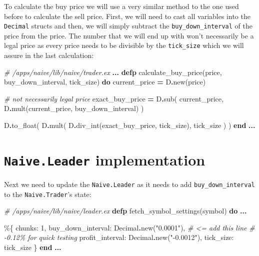 \documentclass[
  oneside]{book}
\newenvironment{Shaded}{\begin{snugshade}}{\end{snugshade}}
\newcommand{\CommentTok}[1]{\textcolor[rgb]{0.56,0.35,0.01}{\textit{#1}}}
\newcommand{\ConstantTok}[1]{\textcolor[rgb]{0.00,0.00,0.00}{#1}}
\newcommand{\DecValTok}[1]{\textcolor[rgb]{0.00,0.00,0.81}{#1}}
\newcommand{\KeywordTok}[1]{\textcolor[rgb]{0.13,0.29,0.53}{\textbf{#1}}}
\newcommand{\NormalTok}[1]{#1}
\newcommand{\OperatorTok}[1]{\textcolor[rgb]{0.81,0.36,0.00}{\textbf{#1}}}
\newcommand{\StringTok}[1]{\textcolor[rgb]{0.31,0.60,0.02}{#1}}
\newcommand{\VariableTok}[1]{\textcolor[rgb]{0.00,0.00,0.00}{#1}}
\begin{document}
To calculate the buy price we will use a very similar method to the one used
before to calculate the sell price. First, we will need to cast all variables
into the \texttt{Decimal} structs and then, we will simply subtract the \texttt{buy\_down\_interval} of the price from the price. The number that we will end up with won't necessarily be a legal price as every price needs to be divisible by the \texttt{tick\_size} which we will assure in the last calculation:

\begin{Shaded}
\begin{Highlighting}[]
  \CommentTok{\# /apps/naive/lib/naive/trader.ex}
  \OperatorTok{...}
  \KeywordTok{defp}\NormalTok{ calculate\_buy\_price(price, buy\_down\_interval, tick\_size) }\KeywordTok{do}
\NormalTok{    current\_price }\OperatorTok{=}\NormalTok{ D}\OperatorTok{.}\NormalTok{new(price)}

    \CommentTok{\# not necessarily legal price}
\NormalTok{    exact\_buy\_price }\OperatorTok{=}
\NormalTok{      D}\OperatorTok{.}\NormalTok{sub(}
\NormalTok{        current\_price,}
\NormalTok{        D}\OperatorTok{.}\NormalTok{mult(current\_price, buy\_down\_interval)}
\NormalTok{      )}

\NormalTok{    D}\OperatorTok{.}\NormalTok{to\_float(}
\NormalTok{      D}\OperatorTok{.}\NormalTok{mult(}
\NormalTok{        D}\OperatorTok{.}\NormalTok{div\_int(exact\_buy\_price, tick\_size),}
\NormalTok{        tick\_size}
\NormalTok{      )}
\NormalTok{    )}
  \KeywordTok{end}
  \OperatorTok{...}
\end{Highlighting}
\end{Shaded}

\hypertarget{naive.leader-implementation}{%
\section{\texorpdfstring{\texttt{Naive.Leader} implementation}{Naive.Leader implementation}}\label{naive.leader-implementation}}

Next we need to update the \texttt{Naive.Leader} as it needs to add \texttt{buy\_down\_interval} to the \texttt{Naive.Trader}'s state:

\begin{Shaded}
\begin{Highlighting}[]
  \CommentTok{\# /apps/naive/lib/naive/leader.ex}
  \KeywordTok{defp}\NormalTok{ fetch\_symbol\_settings(symbol) }\KeywordTok{do}
    \OperatorTok{...}

\NormalTok{    \%\{}
      \VariableTok{chunks:} \DecValTok{1}\NormalTok{,}
      \VariableTok{buy\_down\_interval:} \ConstantTok{Decimal}\OperatorTok{.}\NormalTok{new(}\StringTok{"0.0001"}\NormalTok{), }\CommentTok{\# \textless{}= add this line}
      \CommentTok{\# {-}0.12\% for quick testing}
      \VariableTok{profit\_interval:} \ConstantTok{Decimal}\OperatorTok{.}\NormalTok{new(}\StringTok{"{-}0.0012"}\NormalTok{),}
      \VariableTok{tick\_size:}\NormalTok{ tick\_size}
\NormalTok{    \}}
  \KeywordTok{end}  
  \OperatorTok{...}
\end{Highlighting}
\end{Shaded}
\end{document}
